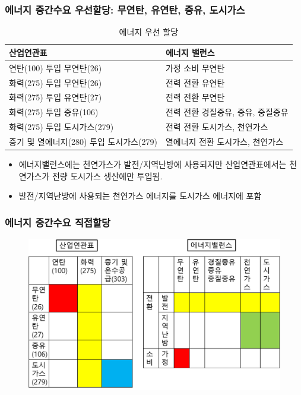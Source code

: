 \documentclass[10pt,compress,slidetop,%
			   hyperref={unicode},xcolor={svgnames},%
			   t]{beamer}
\begin{document}
\begin{frame}
	\frametitle{에너지 중간수요 우선할당: 무연탄, 유연탄, 중유, 도시가스}
\begin{small}
\begin{table}[htbp]
  \centering
  \caption{에너지 우선 할당}
    \begin{tabular}{ll}\hline\hline
    산업연관표 & 에너지 밸런스 \\\hline
    연탄(100) 투입 무연탄(26) & 가정 소비 무연탄 \\
    화력(275) 투입 무연탄(26) & 전력 전환 유연탄 \\
    화력(275) 투입 유연탄(27) & 전력 전환 무연탄 \\
    화력(275) 투입 중유(106) & 전력 전환 경질중유, 중유, 중질중유 \\
    화력(275) 투입 도시가스(279) & 전력 전환 도시가스, 천연가스 \\
    증기 및 열에너지(280) 투입 도시가스(279) & 열에너지 전환 도시가스, 천연가스 \\\hline
    \end{tabular}%
  \label{tab:addlabel}%
\end{table}%
\end{small}
\begin{itemize}
\item{에너지밸런스에는 천연가스가 발전/지역난방에 사용되지만 산업연관표에서는 천연가스가 전량 도시가스 생산에만 투입됨.} 
\item{발전/지역난방에 사용되는 천연가스 에너지를 도시가스 에너지에 포함}
\end{itemize}
	
\end{frame}


\begin{frame}
	\frametitle{에너지 중간수요 직접할당}
	  	\begin{figure}
	\centering
	 \includegraphics[width=1.00\textwidth]{Espec.png}
	\end{figure}	
	
\end{frame}
\end{document}
